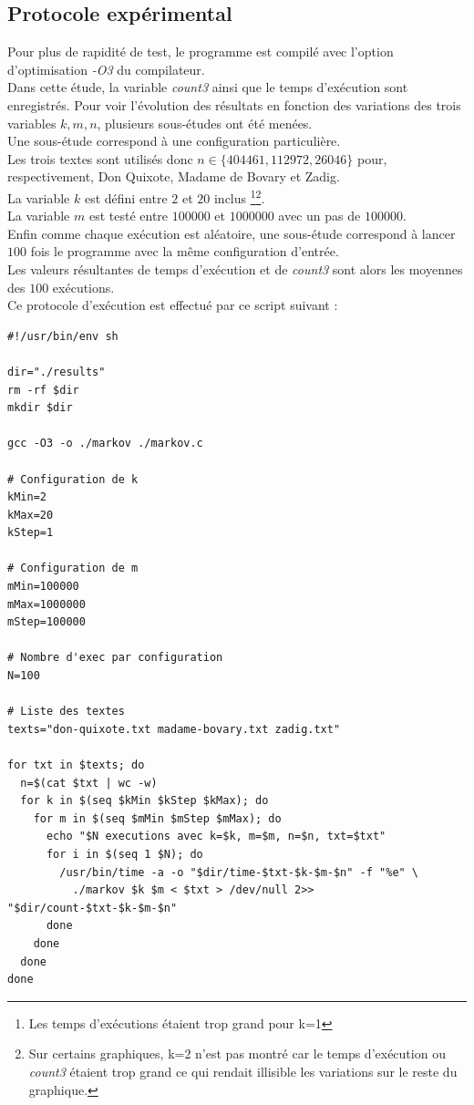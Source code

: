\documentclass[10pt, a4paper]{article}
\begin{document}
\subsection{Protocole expérimental}

Pour plus de rapidité de test, le programme est compilé avec l'option
d'optimisation \emph{-O3} du compilateur. \\

Dans cette étude, la variable \emph{count3} ainsi que le temps d'exécution sont
enregistrés. Pour voir l'évolution des résultats en fonction des variations des
trois variables $k, m, n$, plusieurs sous-études ont été menées. \\

Une sous-étude correspond à une configuration particulière. \\
Les trois textes sont utilisés donc $n\in\{404461, 112972, 26046\}$ pour,
respectivement, Don Quixote, Madame de Bovary et Zadig. \\
La variable $k$ est défini entre $2$ et $20$ inclus \footnote{Les temps
d'exécutions étaient trop grand pour k=1}\footnote{Sur certains graphiques, k=2
n'est pas montré car le temps d'exécution ou \emph{count3} étaient trop grand
ce qui rendait illisible les variations sur le reste du graphique.}. \\
La variable $m$ est testé entre $100000$ et $1000000$ avec un pas de $100000$. \\
Enfin comme chaque exécution est aléatoire, une sous-étude correspond à lancer
$100$ fois le programme avec la même configuration d'entrée. \\
Les valeurs résultantes de temps d'exécution et de \emph{count3} sont alors les
moyennes des $100$ exécutions. \\

Ce protocole d'exécution est effectué par ce script suivant : \\
\begin{verbatim}
#!/usr/bin/env sh

dir="./results"
rm -rf $dir
mkdir $dir

gcc -O3 -o ./markov ./markov.c

# Configuration de k
kMin=2
kMax=20
kStep=1

# Configuration de m
mMin=100000
mMax=1000000
mStep=100000

# Nombre d'exec par configuration
N=100

# Liste des textes
texts="don-quixote.txt madame-bovary.txt zadig.txt"

for txt in $texts; do
  n=$(cat $txt | wc -w)
  for k in $(seq $kMin $kStep $kMax); do
    for m in $(seq $mMin $mStep $mMax); do
      echo "$N executions avec k=$k, m=$m, n=$n, txt=$txt"
      for i in $(seq 1 $N); do
        /usr/bin/time -a -o "$dir/time-$txt-$k-$m-$n" -f "%e" \
          ./markov $k $m < $txt > /dev/null 2>> "$dir/count-$txt-$k-$m-$n"
      done
    done
  done
done
\end{verbatim}
\end{document}
